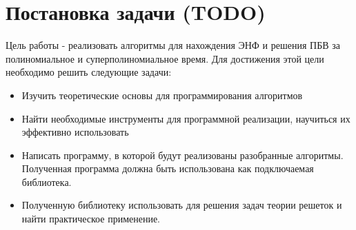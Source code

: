 \newpage

\section{Постановка задачи (TODO)}

Цель работы - реализовать алгоритмы для нахождения ЭНФ и решения ПБВ за полиномиальное и суперполиномиальное время. Для достижения этой цели необходимо решить следующие задачи:
\begin{itemize}
\item Изучить теоретические основы для программирования алгоритмов
\item Найти необходимые инструменты для программной реализации, научиться их эффективно использовать
\item Написать программу, в которой будут реализованы разобранные алгоритмы. Полученная программа должна быть использована как подключаемая библиотека.
\item Полученную библиотеку использовать для решения задач теории решеток и найти практическое применение.
\end{itemize}  

\clearpage
